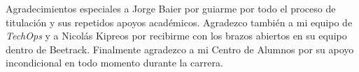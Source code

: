 Agradecimientos especiales a Jorge Baier por guiarme por todo el proceso de titulación y sus repetidos apoyos académicos. Agradezco también a mi equipo de \textit{TechOps} y a Nicolás Kipreos por recibirme con los brazos abiertos en su equipo dentro de Beetrack. Finalmente agradezco a mi Centro de Alumnos por su apoyo incondicional en todo momento durante la carrera.